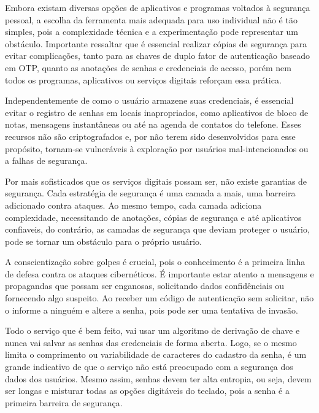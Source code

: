 \documentclass[12pt]{article}
\begin{document}
Embora existam diversas opções de aplicativos e programas voltados à segurança
pessoal, a escolha da ferramenta mais adequada para uso individual não é tão
simples, pois a complexidade técnica e a experimentação pode representar um obstáculo.
Importante ressaltar que é essencial realizar cópias de segurança para evitar
complicações, tanto para as chaves de duplo fator de autenticação baseado em OTP,
quanto as anotações de senhas e credenciais de acesso, porém nem todos os programas,
aplicativos ou serviços digitais reforçam essa prática.

Independentemente de como o usuário armazene suas credenciais, é essencial evitar o
registro de senhas em locais inapropriados, como aplicativos de bloco de notas,
mensagens instantâneas ou até na agenda de contatos do telefone.
Esses recursos não são criptografados e, por não terem sido desenvolvidos para esse
propósito, tornam-se vulneráveis à exploração por usuários mal-intencionados ou a falhas
de segurança.


Por mais sofisticados que os serviços digitais possam ser, não existe garantias de segurança.
Cada estratégia de segurança é uma camada a mais, uma barreira adicionado contra ataques.
Ao mesmo tempo, cada camada adiciona complexidade, necessitando de anotações, cópias de
segurança e até aplicativos confiaveis, do contrário, as camadas de segurança que deviam
proteger o usuário, pode se tornar um obstáculo para o próprio usuário.

A conscientização sobre golpes é crucial, pois o conhecimento é a primeira linha de defesa contra
os ataques cibernéticos.
É importante estar atento a mensagens e propagandas que possam ser enganosas, solicitando dados
confidênciais ou fornecendo algo suspeito.
Ao receber um código de autenticação sem solicitar, não o informe a ninguém e altere a senha,
pois pode ser uma tentativa de invasão.

Todo o serviço que é bem feito, vai usar um algoritmo de derivação de chave e nunca vai salvar
as senhas das credenciais de forma aberta.
Logo, se o mesmo limita o comprimento ou variabilidade de caracteres do cadastro da senha, é um
grande indicativo de que o serviço não está preocupado com a segurança dos dados dos usuários.
Mesmo assim, senhas devem ter alta entropia, ou seja, devem ser longas e misturar todas as opções
digitáveis do teclado, pois a senha é a primeira barreira de segurança.



\end{document}
